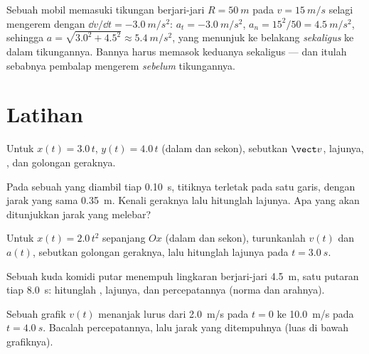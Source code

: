 \begin{example}\label{ex:g12:kinematics-2d:bend}
Sebuah mobil memasuki tikungan berjari-jari $R = \qty{50}{m}$ pada
$v = \qty{15}{m/s}$ selagi mengerem dengan
$\dd v/\dd t = \qty{-3.0}{m/s^2}$: $a_t =
\qty{-3.0}{m/s^2}$,
$a_n = 15^2/50 = \qty{4.5}{m/s^2}$, sehingga
$a =
\sqrt{3.0^2 + 4.5^2} \approx \qty{5.4}{m/s^2}$, yang menunjuk ke
belakang \emph{sekaligus} ke dalam tikungannya. Bannya harus memasok
keduanya sekaligus --- dan itulah sebabnya pembalap mengerem
\emph{sebelum} tikungannya.
\end{example}

\section{Latihan}

\begin{exercise}[$\star$]\label{exo:g12:kinematics-2d:1}
Untuk $x(t) = 3.0\,t$, $y(t) = 4.0\,t$ (dalam  dan sekon),
sebutkan $\vect v$, lajunya, , dan golongan geraknya.
\end{exercise}

\begin{exercise}[$\star$]\label{exo:g12:kinematics-2d:2}
Pada sebuah  yang diambil tiap \qty{0.10}{s}, titiknya
terletak pada satu garis, dengan jarak yang sama \qty{0.35}{m}. Kenali
geraknya lalu hitunglah lajunya. Apa yang akan ditunjukkan jarak yang
melebar?
\end{exercise}

\begin{exercise}[$\star$]\label{exo:g12:kinematics-2d:3}
Untuk $x(t) = 2.0\,t^2$ sepanjang $Ox$ (dalam  dan sekon),
turunkanlah $v(t)$ dan $a(t)$, sebutkan golongan geraknya, lalu
hitunglah lajunya pada $t = \qty{3.0}{s}$.
\end{exercise}

\begin{exercise}[$\star$]\label{exo:g12:kinematics-2d:4}
Sebuah kuda komidi putar menempuh lingkaran berjari-jari \qty{4.5}{m},
satu putaran tiap \qty{8.0}{s}: hitunglah , lajunya, dan
percepatannya (norma dan arahnya).
\end{exercise}

\begin{exercise}[$\star$]\label{exo:g12:kinematics-2d:5}
Sebuah grafik $v(t)$ menanjak lurus dari \qty{2.0}{m/s} pada $t = 0$ ke
\qty{10.0}{m/s} pada $t = \qty{4.0}{s}$. Bacalah percepatannya, lalu
jarak yang ditempuhnya (luas di bawah grafiknya).
\end{exercise}

